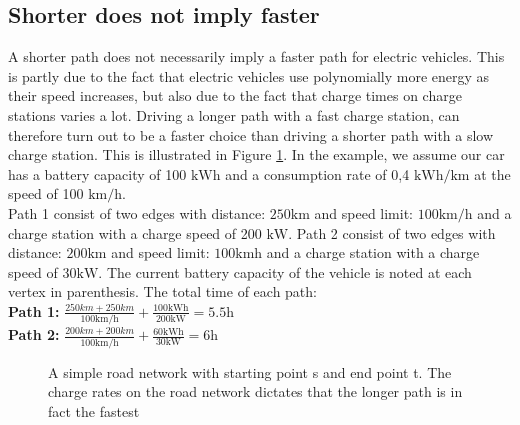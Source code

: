 \subsection{Shorter does not imply faster}
\label{sec:shorternotfaster}

A shorter path does not necessarily imply a faster path for electric vehicles. This is partly due to the fact that electric vehicles use polynomially more energy as their speed increases, but also due to the fact that charge times on charge stations varies a lot. Driving a longer path with a fast charge station, can therefore turn out to be a faster choice than driving a shorter path with a slow charge station. This is illustrated in Figure \ref{fig:simpleroad-network}. In the example, we assume our car has a battery capacity of 100 $\si{\kWh}$ and a consumption rate of 0,4 $\si{\kWh\per\km}$ at the speed of 100 $\si{\km\per\hour}$.\\

Path 1 consist of two edges with distance: $ 250 \si{\km}$ and speed limit: $100 \si{\km\per\hour}$
and a charge station with a charge speed of 200 $\si{\kW}$. Path 2 consist of two edges with distance: $200 \si{\km}$ and speed limit: $100 \si{\km\hour}$ and a charge station with a charge speed of $30\si{\kW}$. The current battery capacity of the vehicle is noted at each vertex in parenthesis. The total time of each path:\\
				
\textbf{Path 1:} $\frac{250\si{km} + 250\si{km}}{100\si{\km\per\hour}} + \frac{100\si{\kWh}}{200\si{\kW}} = 5.5\si{\hour}$\\

\textbf{Path 2:} $\frac{200\si{km} + 200\si{km}}{100 \si{\km\per\hour}} + \frac{60\si{\kWh}}{30\si{\kW}} = 6\si{\hour}$\\

\begin{figure}
\label{fig:simpleroad-network}
\caption{A simple road network with starting point s and end point t. The charge rates on the road network dictates that the longer path is in fact the fastest}
\end{figure}